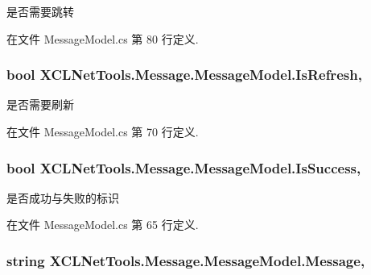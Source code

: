 是否需要跳转 



在文件 Message\-Model.\-cs 第 80 行定义.

\hypertarget{class_x_c_l_net_tools_1_1_message_1_1_message_model_a9bdd2a6fd62936962fe1a06233809f02}{
\subsubsection[{Is\-Refresh}]{\setlength{\rightskip}{0pt plus 5cm}bool X\-C\-L\-Net\-Tools.\-Message.\-Message\-Model.\-Is\-Refresh\hspace{0.3cm}{\ttfamily [get]}, {\ttfamily [set]}}}\label{class_x_c_l_net_tools_1_1_message_1_1_message_model_a9bdd2a6fd62936962fe1a06233809f02}


是否需要刷新 



在文件 Message\-Model.\-cs 第 70 行定义.

\hypertarget{class_x_c_l_net_tools_1_1_message_1_1_message_model_a05485b542b8ef7f795ed5618fb80da03}{
\subsubsection[{Is\-Success}]{\setlength{\rightskip}{0pt plus 5cm}bool X\-C\-L\-Net\-Tools.\-Message.\-Message\-Model.\-Is\-Success\hspace{0.3cm}{\ttfamily [get]}, {\ttfamily [set]}}}\label{class_x_c_l_net_tools_1_1_message_1_1_message_model_a05485b542b8ef7f795ed5618fb80da03}


是否成功与失败的标识 



在文件 Message\-Model.\-cs 第 65 行定义.

\hypertarget{class_x_c_l_net_tools_1_1_message_1_1_message_model_a2c6df6335e3adab4b188833ce8fec192}{
\subsubsection[{Message}]{\setlength{\rightskip}{0pt plus 5cm}string X\-C\-L\-Net\-Tools.\-Message.\-Message\-Model.\-Message\hspace{0.3cm}{\ttfamily [get]}, {\ttfamily [set]}}}\label{class_x_c_l_net_tools_1_1_message_1_1_message_model_a2c6df6335e3adab4b188833ce8fec192}


